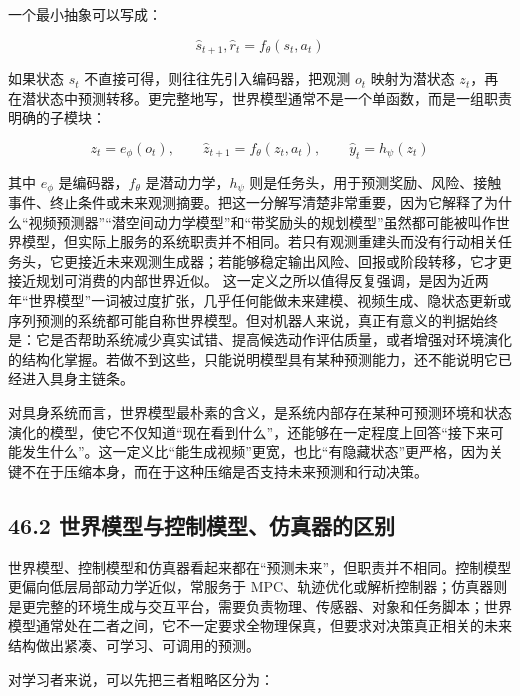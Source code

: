 一个最小抽象可以写成：

\begin{equation*}
\hat{s}_{t+1}, \hat{r}_t = f_\theta(s_t, a_t)
\end{equation*}

如果状态 \(s_t\) 不直接可得，则往往先引入编码器，把观测 \(o_t\) 映射为潜状态 \(z_t\)，再在潜状态中预测转移。更完整地写，世界模型通常不是一个单函数，而是一组职责明确的子模块：

\begingroup
\scriptsize
\begin{equation*}
z_t = e_\phi(o_t), \qquad
\hat{z}_{t+1} = f_\theta(z_t, a_t), \qquad
\hat{y}_t = h_\psi(z_t)
\end{equation*}
\endgroup

其中 \(e_\phi\) 是编码器，\(f_\theta\) 是潜动力学，\(h_\psi\) 则是任务头，用于预测奖励、风险、接触事件、终止条件或未来观测摘要。把这一分解写清楚非常重要，因为它解释了为什么“视频预测器”“潜空间动力学模型”和“带奖励头的规划模型”虽然都可能被叫作世界模型，但实际上服务的系统职责并不相同。若只有观测重建头而没有行动相关任务头，它更接近未来观测生成器；若能够稳定输出风险、回报或阶段转移，它才更接近规划可消费的内部世界近似。 这一定义之所以值得反复强调，是因为近两年“世界模型”一词被过度扩张，几乎任何能做未来建模、视频生成、隐状态更新或序列预测的系统都可能自称世界模型。但对机器人来说，真正有意义的判据始终是：它是否帮助系统减少真实试错、提高候选动作评估质量，或者增强对环境演化的结构化掌握。若做不到这些，只能说明模型具有某种预测能力，还不能说明它已经进入具身主链条。

对具身系统而言，世界模型最朴素的含义，是系统内部存在某种可预测环境和状态演化的模型，使它不仅知道“现在看到什么”，还能够在一定程度上回答“接下来可能发生什么”。这一定义比“能生成视频”更宽，也比“有隐藏状态”更严格，因为关键不在于压缩本身，而在于这种压缩是否支持未来预测和行动决策。

\subsection*{46.2 世界模型与控制模型、仿真器的区别}


世界模型、控制模型和仿真器看起来都在“预测未来”，但职责并不相同。控制模型更偏向低层局部动力学近似，常服务于 MPC、轨迹优化或解析控制器；仿真器则是更完整的环境生成与交互平台，需要负责物理、传感器、对象和任务脚本；世界模型通常处在二者之间，它不一定要求全物理保真，但要求对决策真正相关的未来结构做出紧凑、可学习、可调用的预测。

对学习者来说，可以先把三者粗略区分为：

